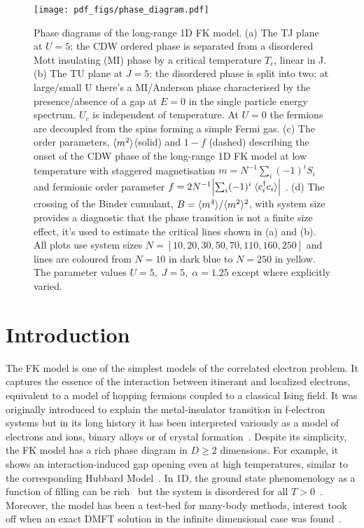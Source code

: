 \begin{figure}
\hypertarget{fig:phase_diagram}{%
\centering
\texttt{[image: pdf\_figs/phase\_diagram.pdf]}
\caption{Phase diagrams of the long-range 1D {FK} model. (a) The TJ plane at \(U = 5\): the {CDW} ordered phase is separated from a disordered Mott insulating (MI) phase by a critical temperature \(T_c\), linear in J. (b) The TU plane at \(J = 5\): the disordered phase is split into two: at large/small U there's a MI/Anderson phase characterised by the presence/absence of a gap at \(E=0\) in the single particle energy spectrum. \(U_c\) is independent of temperature. At \(U = 0\) the fermions are decoupled from the spins forming a simple Fermi gas. (c) The order parameters, \(\langle m^2 \rangle\)(solid) and \(1 - f\) (dashed) describing the onset of the {CDW} phase of the long-range 1D {FK} model at low temperature with staggered magnetisation \(m = N^{-1} \sum_i (-1)^i S_i\) and fermionic order parameter \(f = 2 N^{-1}\abs{\sum_i (-1)^i \; \langle c^\dag_{i}c_{i} \rangle}\) . (d) The crossing of the Binder cumulant, \(B = \langle m^4 \rangle / \langle m^2 \rangle^2\), with system size provides a diagnostic that the phase transition is not a finite size effect, it's used to estimate the critical lines shown in (a) and (b). All plots use system sizes \(N = [10,20,30,50,70,110,160,250]\) and lines are coloured from \(N = 10\) in dark blue to \(N = 250\) in yellow. The parameter values \(U = 5,\;J = 5,\;\alpha = 1.25\) except where explicitly varied.}\label{fig:phase_diagram}
}
\end{figure}

\hypertarget{introduction-1}{%
\section{Introduction}\label{introduction-1}}

The {FK} model is one of the simplest models of the correlated electron problem. It captures the essence of the interaction between itinerant and localized electrons, equivalent to a model of hopping fermions coupled to a classical Ising field. It was originally introduced to explain the metal-insulator transition in f-electron systems but in its long history it has been interpreted variously as a model of electrons and ions, binary alloys or of crystal formation~\autocite{hubbardj.ElectronCorrelationsNarrow1963,falicovSimpleModelSemiconductorMetal1969,gruberFalicovKimballModelReview1996,gruberFalicovKimballModel2006}. Despite its simplicity, the {FK} model has a rich phase diagram in \(D \geq 2\) dimensions. For example, it shows an interaction-induced gap opening even at high temperatures, similar to the corresponding Hubbard Model~\autocite{brandtThermodynamicsCorrelationFunctions1989}. In 1D, the ground state phenomenology as a function of filling can be rich~\autocite{gruberGroundStatesSpinless1990} but the system is disordered for all \(T > 0\)~\autocite{kennedyItinerantElectronModel1986}. Moreover, the model has been a test-bed for many-body methods, interest took off when an exact DMFT solution in the infinite dimensional case was found~\autocite{antipovCriticalExponentsStrongly2014,ribicNonlocalCorrelationsSpectral2016,freericksExactDynamicalMeanfield2003,herrmannNonequilibriumDynamicalCluster2016}.

